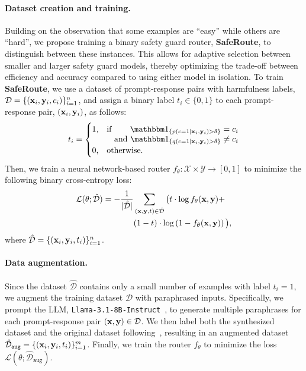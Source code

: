\paragraph{Dataset creation and training.}
Building on the observation that some examples are ``easy'' while others are ``hard'', we propose training a binary safety guard router, \textbf{SafeRoute}, to distinguish between these instances. 
This allows for adaptive selection between smaller and larger safety guard models, thereby optimizing the trade-off between efficiency and accuracy compared to using either model in isolation.
To train \textbf{SafeRoute},  we use a dataset of prompt-response pairs with harmfulness labels, $\mathcal{D}=\{({\mathbf{x}}_i, {\mathbf{y}}_i, c_i)  \}_{i=1}^n$, and assign a binary label $t_i\in\{0,1\}$ to each prompt-response pair, $({\mathbf{x}}_i, {\mathbf{y}}_i)$, as follows:
\begin{align}
    t_i=\begin{cases}
        1\text{,} 
        & \text{if } 
        \begin{aligned}[t]
            \one_{\{p(c=1 \mid \rvx_i, \rvy_i) > \delta\}} &= c_i \\
            \text{and } \one_{\{q(c =1 \mid \rvx_i, \rvy_i) > \delta\}} &\neq c_i
        \end{aligned} \\
        0\text{,} 
        & \text{otherwise}.
    \end{cases}
\label{eq:label}
\end{align}
Then, we train a neural network-based router $f_\theta: \mathcal{X}\times \mathcal{Y}\to [0,1]$ to minimize the following binary cross-entropy loss:
\begin{align*}
\begin{split}
    \mathcal{L}(\theta;\hat{\mathcal{D}}) = -\frac{1}{\lvert \hat{\mathcal{D}}\rvert}&\sum_{({\mathbf{x}},{\mathbf{y}}, t)\in \hat{\mathcal{D}}} \big( t \cdot \log f_\theta({\mathbf{x}}, {\mathbf{y}}) + \\ 
    &(1-t)  \cdot \log \left(1-f_\theta({\mathbf{x}}, {\mathbf{y}})\right) \big),
\end{split}
\end{align*}
where $\hat{\mathcal{D}}=\{({\mathbf{x}}_i, {\mathbf{y}}_i, t_i)\}_{i=1}^n$.

\paragraph{Data augmentation.} Since the dataset $\hat{\mathcal{D}}$ contains only a small number of examples with label $t_i=1$,  we augment the training dataset $\mathcal{D}$ with paraphrased inputs. Specifically, we prompt the LLM, \texttt{Llama-3.1-8B-Instruct}~\citep{llama-3}, to generate multiple paraphrases for each prompt-response pair $({\mathbf{x}},{\mathbf{y}})\in\mathcal{D}$. We then label both the synthesized dataset and the original dataset following~, resulting in an augmented dataset $\hat{\mathcal{D}}_\texttt{aug}=\{({\mathbf{x}}_i, {\mathbf{y}}_i, t_i) \}_{i=1}^m$. Finally, we train the router $f_\theta$ to minimize the loss $\mathcal{L}(\theta;\hat{\mathcal{D}}_\texttt{aug})$.


